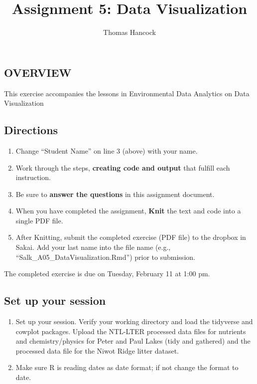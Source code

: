 \documentclass[
]{article}
\title{Assignment 5: Data Visualization}
\author{Thomas Hancock}
\date{}
\providecommand{\tightlist}{%
  \setlength{\itemsep}{0pt}\setlength{\parskip}{0pt}}
\begin{document}
\maketitle

\hypertarget{overview}{%
\subsection{OVERVIEW}\label{overview}}

This exercise accompanies the lessons in Environmental Data Analytics on
Data Visualization

\hypertarget{directions}{%
\subsection{Directions}\label{directions}}

\begin{enumerate}
\def\labelenumi{\arabic{enumi}.}
\tightlist
\item
  Change ``Student Name'' on line 3 (above) with your name.
\item
  Work through the steps, \textbf{creating code and output} that fulfill
  each instruction.
\item
  Be sure to \textbf{answer the questions} in this assignment document.
\item
  When you have completed the assignment, \textbf{Knit} the text and
  code into a single PDF file.
\item
  After Knitting, submit the completed exercise (PDF file) to the
  dropbox in Sakai. Add your last name into the file name (e.g.,
  ``Salk\_A05\_DataVisualization.Rmd'') prior to submission.
\end{enumerate}

The completed exercise is due on Tuesday, February 11 at 1:00 pm.

\hypertarget{set-up-your-session}{%
\subsection{Set up your session}\label{set-up-your-session}}

\begin{enumerate}
\def\labelenumi{\arabic{enumi}.}
\item
  Set up your session. Verify your working directory and load the
  tidyverse and cowplot packages. Upload the NTL-LTER processed data
  files for nutrients and chemistry/physics for Peter and Paul Lakes
  (tidy and gathered) and the processed data file for the Niwot Ridge
  litter dataset.
\item
  Make sure R is reading dates as date format; if not change the format
  to date.
\end{enumerate}
\end{document}
